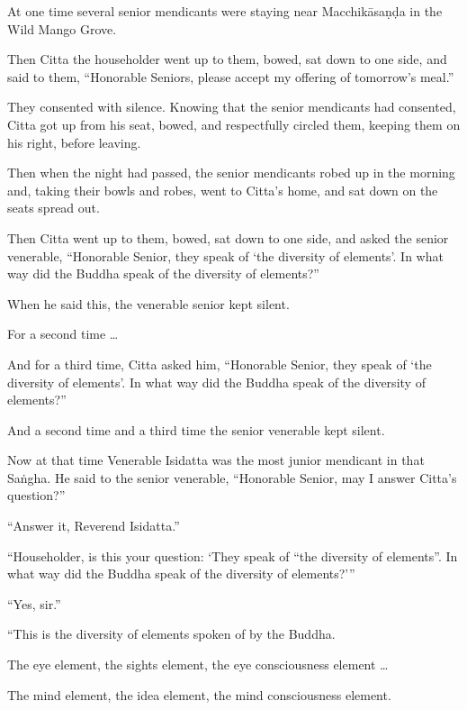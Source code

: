 \documentclass[12pt,openany]{book}%
\begin{document}
At one time several senior mendicants were staying near \textsanskrit{Macchikāsaṇḍa} in the Wild Mango Grove. 

Then Citta the householder went up to them, bowed, sat down to one side, and said to them, “Honorable Seniors, please accept my offering of tomorrow’s meal.” 

They consented with silence. Knowing that the senior mendicants had consented, Citta got up from his seat, bowed, and respectfully circled them, keeping them on his right, before leaving. 

Then when the night had passed, the senior mendicants robed up in the morning and, taking their bowls and robes, went to Citta’s home, and sat down on the seats spread out. 

Then Citta went up to them, bowed, sat down to one side, and asked the senior venerable, “Honorable Senior, they speak of ‘the diversity of elements’. In what way did the Buddha speak of the diversity of elements?” 

When he said this, the venerable senior kept silent. 

For a second time … 

And for a third time, Citta asked him, “Honorable Senior, they speak of ‘the diversity of elements’. In what way did the Buddha speak of the diversity of elements?” 

And a second time and a third time the senior venerable kept silent. 

Now at that time Venerable Isidatta was the most junior mendicant in that \textsanskrit{Saṅgha}. He said to the senior venerable, “Honorable Senior, may I answer Citta’s question?” 

“Answer it, Reverend Isidatta.” 

“Householder, is this your question: ‘They speak of “the diversity of elements”. In what way did the Buddha speak of the diversity of elements?’” 

“Yes, sir.” 

“This is the diversity of elements spoken of by the Buddha. 

The eye element, the sights element, the eye consciousness element … 

The mind element, the idea element, the mind consciousness element. 
\end{document}
